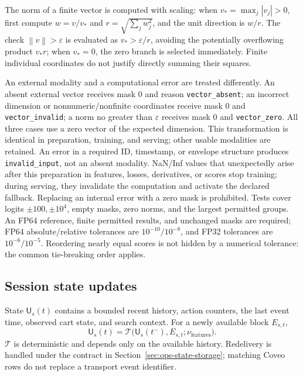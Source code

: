 \documentclass[12pt,a4paper]{article}
\newcommand{\code}[1]{{\ttfamily\small\nolinkurl{#1}}}
\newcommand{\eps}{\varepsilon}
\newcommand{\norm}[1]{\left\lVert#1\right\rVert}
\theoremstyle{plainru}
\begin{document}
The norm of a finite vector is computed with scaling: when
$v_*=\max_j|v_j|>0$, first compute $w=v/v_*$ and $r=\sqrt{\sum_jw_j^2}$,
and the unit direction is $w/r$. The check $\norm v>\eps$
is evaluated as $v_*>\eps/r$, avoiding the potentially overflowing
product $v_*r$; when $v_*=0$, the zero branch is selected immediately.
Finite individual coordinates do not justify directly summing their squares.

An external modality and a computational error are treated differently.
An absent external vector receives mask 0 and reason
\code{vector_absent}; an incorrect dimension or nonnumeric/nonfinite
coordinates receive mask 0 and \code{vector_invalid}; a norm no greater than
$\eps$ receives mask 0 and \code{vector_zero}. All three cases
use a zero vector of the expected dimension. This transformation is identical
in preparation, training, and serving; other usable
modalities are retained. An error in a required ID, timestamp, or envelope structure
produces \code{invalid_input}, not an absent modality.
NaN/Inf values that unexpectedly arise after this preparation in features,
losses, derivatives, or scores stop training; during serving,
they invalidate the computation and activate the declared fallback.
Replacing an internal error with a zero mask is prohibited.
Tests cover logits $\pm100,\pm10^4$, empty masks,
zero norms, and the largest permitted groups. An FP64 reference,
finite permitted results, and unchanged masks are required;
FP64 absolute/relative tolerances are $10^{-10}/10^{-8}$,
and FP32 tolerances are $10^{-6}/10^{-5}$. Reordering nearly equal
scores is not hidden by a numerical tolerance: the common tie-breaking order applies.

\subsection{Session state updates}

State \(\mathsf U_s(t)\) contains a bounded recent history,
action counters, the last event time, observed cart
state, and search context. For a newly available block \(E_{s,t}\),
\begin{equation}\label{eq:ops-state-update}
\mathsf U_s(t)=\mathcal T\bigl(\mathsf U_s(t^-),E_{s,t};\nu_{\mathrm{features}}\bigr).
\end{equation}
\(\mathcal T\) is deterministic and depends only on the available history.
Redelivery is handled under the contract in
Section~\ref{sec:ops-state-storage}; matching Coveo rows
do not replace a transport event identifier.
\end{document}
